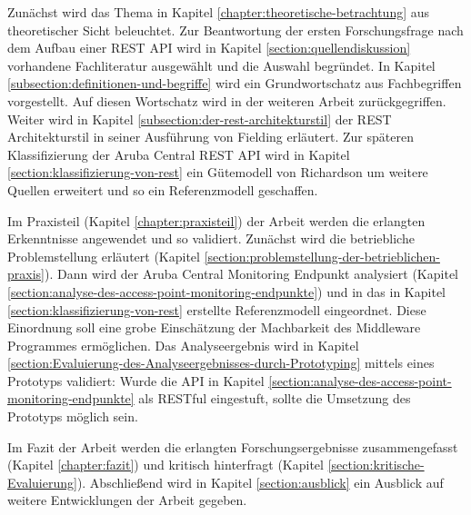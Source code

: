 Zunächst wird das Thema in Kapitel \ref{chapter:theoretische-betrachtung} aus theoretischer Sicht beleuchtet. Zur Beantwortung der ersten Forschungsfrage nach dem Aufbau einer REST API wird in Kapitel \ref{section:quellendiskussion} vorhandene Fachliteratur ausgewählt und die Auswahl begründet. In Kapitel \ref{subsection:definitionen-und-begriffe} wird ein Grundwortschatz aus Fachbegriffen vorgestellt. Auf diesen Wortschatz wird in der weiteren Arbeit zurückgegriffen. Weiter wird in Kapitel \ref{subsection:der-rest-architekturstil} der REST Architekturstil in seiner Ausführung von Fielding erläutert. Zur späteren Klassifizierung der Aruba Central REST API wird in Kapitel \ref{section:klassifizierung-von-rest} ein Gütemodell von Richardson um weitere Quellen erweitert und so ein Referenzmodell geschaffen.

Im Praxisteil (Kapitel \ref{chapter:praxisteil}) der Arbeit werden die erlangten Erkenntnisse angewendet und so validiert. Zunächst wird die betriebliche Problemstellung erläutert (Kapitel \ref{section:problemstellung-der-betrieblichen-praxis}). Dann wird der Aruba Central Monitoring Endpunkt analysiert (Kapitel \ref{section:analyse-des-access-point-monitoring-endpunkte}) und in das in Kapitel \ref{section:klassifizierung-von-rest} erstellte Referenzmodell eingeordnet. Diese Einordnung soll eine grobe Einschätzung der Machbarkeit des Middleware Programmes ermöglichen. Das Analyseergebnis wird in Kapitel \ref{section:Evaluierung-des-Analyseergebnisses-durch-Prototyping} mittels eines Prototyps validiert: Wurde die API in Kapitel \ref{section:analyse-des-access-point-monitoring-endpunkte} als RESTful eingestuft, sollte die Umsetzung des Prototyps möglich sein.

Im Fazit der Arbeit werden die erlangten Forschungsergebnisse zusammengefasst (Kapitel \ref{chapter:fazit}) und kritisch hinterfragt (Kapitel \ref{section:kritische-Evaluierung}). Abschließend wird in Kapitel \ref{section:ausblick} ein Ausblick auf weitere Entwicklungen der Arbeit gegeben.





